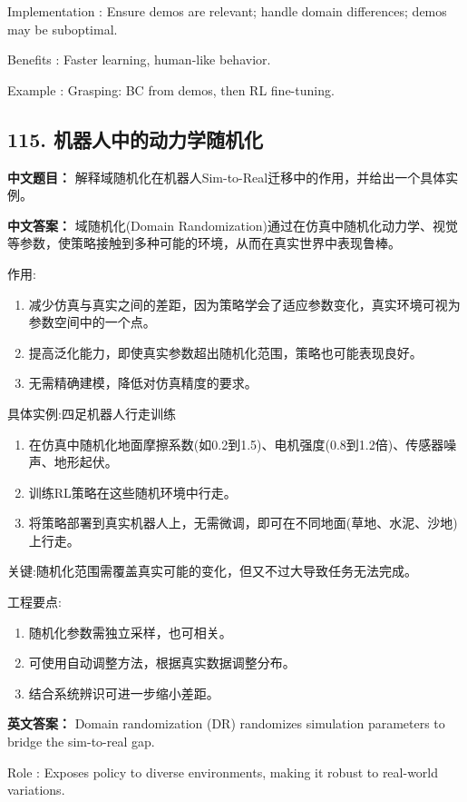 \documentclass[10pt,a4paper]{ctexart}
\begin{document}
 Implementation : Ensure demos are relevant; handle domain differences; demos may be suboptimal.

 Benefits : Faster learning, human-like behavior.

 Example : Grasping: BC from demos, then RL fine-tuning.

\subsection*{115. 机器人中的动力学随机化}
\textbf{中文题目：} 解释域随机化在机器人Sim-to-Real迁移中的作用，并给出一个具体实例。

\textbf{中文答案：}  
域随机化(Domain Randomization)通过在仿真中随机化动力学、视觉等参数，使策略接触到多种可能的环境，从而在真实世界中表现鲁棒。

 作用:
\begin{enumerate}
    \item 减少仿真与真实之间的差距，因为策略学会了适应参数变化，真实环境可视为参数空间中的一个点。
    \item 提高泛化能力，即使真实参数超出随机化范围，策略也可能表现良好。
    \item 无需精确建模，降低对仿真精度的要求。
\end{enumerate}

 具体实例:四足机器人行走训练
\begin{enumerate}
    \item 在仿真中随机化地面摩擦系数(如0.2到1.5)、电机强度(0.8到1.2倍)、传感器噪声、地形起伏。
    \item 训练RL策略在这些随机环境中行走。
    \item 将策略部署到真实机器人上，无需微调，即可在不同地面(草地、水泥、沙地)上行走。
\end{enumerate}

 关键:随机化范围需覆盖真实可能的变化，但又不过大导致任务无法完成。

 工程要点:
\begin{enumerate}
    \item 随机化参数需独立采样，也可相关。
    \item 可使用自动调整方法，根据真实数据调整分布。
    \item 结合系统辨识可进一步缩小差距。
\end{enumerate}

\textbf{英文答案：}  
Domain randomization (DR) randomizes simulation parameters to bridge the sim-to-real gap.

 Role : Exposes policy to diverse environments, making it robust to real-world variations.
\end{document}
